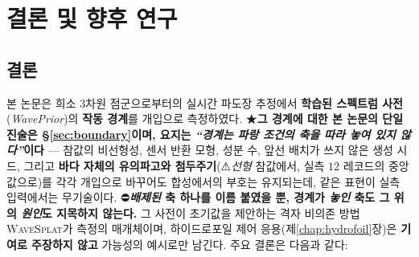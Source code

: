 \documentclass[11pt]{report}
\numberwithin{equation}{chapter}
\numberwithin{figure}{chapter}
\numberwithin{table}{chapter}
\newcommand{\WS}{\textsc{WaveSplat}}
\begin{document}
\chapter{결론 및 향후 연구}
\label{chap:conclusion}

\section{결론}
\label{sec:conclusion}

본 논문은 희소 3차원 점군으로부터의 실시간 파도장 추정에서
\textbf{학습된 스펙트럼 사전}(\emph{WavePrior})의 \textbf{작동 경계}를 개입으로 측정하였다.
★\textbf{그 경계에 대한 본 논문의 단일 진술은 \S\ref{sec:boundary}이며, 요지는
\emph{``경계는 파랑 조건의 축을 따라 놓여 있지 않다''}이다} --- 참값의 비선형성,
센서 반환 모형, 성분 수, 앞선 배치가 쓰지 않은 생성 시드, 그리고 \textbf{바다 자체의
유의파고와 첨두주기}(⚠\emph{선형} 참값에서, 실측 $12$ 레코드의 중앙값으로)를
각각 개입으로 바꾸어도 합성에서의 부호는 유지되는데, 같은 표현이 실측 입력에서는
무기술이다. ⛔\textbf{\emph{배제된} 축 하나를 이름 붙였을 뿐, 경계가 \emph{놓인} 축도
그 위의 \emph{원인}도 지목하지 않는다.}
그 사전이 초기값을 제안하는 격자 비의존 방법 \WS{}가 측정의 매개체이며,
하이드로포일 제어 응용(제\ref{chap:hydrofoil}장)은 \textbf{기여로 주장하지 않고}
가능성의 예시로만 남긴다.
주요 결론은 다음과 같다:
\end{document}
